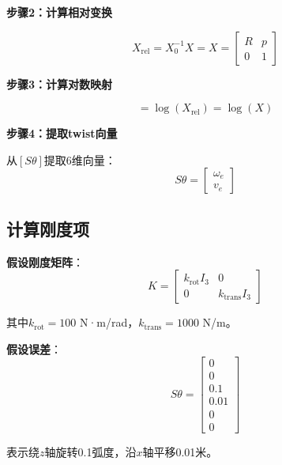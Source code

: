\documentclass[12pt,a4paper]{article}
\begin{document}
\textbf{步骤2：计算相对变换}

\begin{equation}
X_{\text{rel}} = X_0^{-1} X = X = \begin{bmatrix} R & p \\ 0 & 1 \end{bmatrix}
\end{equation}

\textbf{步骤3：计算对数映射}

\begin{equation}
[S\theta] = \log(X_{\text{rel}}) = \log(X)
\end{equation}

\textbf{步骤4：提取twist向量}

从$[S\theta]$提取6维向量：
\begin{equation}
S\theta = \begin{bmatrix} \omega_e \\ v_e \end{bmatrix}
\end{equation}

\subsection{计算刚度项}

\textbf{假设刚度矩阵}：
\begin{equation}
K = \begin{bmatrix} k_{\text{rot}} I_3 & 0 \\ 0 & k_{\text{trans}} I_3 \end{bmatrix}
\end{equation}

其中$k_{\text{rot}} = 100$ N·m/rad，$k_{\text{trans}} = 1000$ N/m。

\textbf{假设误差}：
\begin{equation}
S\theta = \begin{bmatrix} 0 \\ 0 \\ 0.1 \\ 0.01 \\ 0 \\ 0 \end{bmatrix}
\end{equation}

表示绕$z$轴旋转0.1弧度，沿$x$轴平移0.01米。
\end{document}
